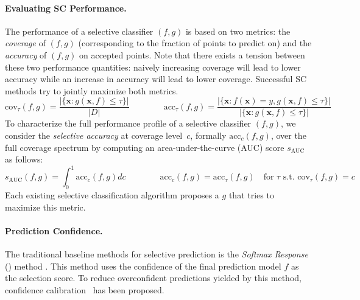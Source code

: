 \paragraph{Evaluating SC Performance.} The performance of a selective classifier $(f,g)$ is based on two metrics: the \emph{coverage} of $(f,g)$ (corresponding to the fraction of points to predict on) and the \emph{accuracy} of $(f,g)$ on accepted points. Note that there exists a tension between these two performance quantities: naively increasing coverage will lead to lower accuracy while an increase in accuracy will lead to lower coverage. Successful SC methods try to jointly maximize both metrics.
    \begin{equation}
    \text{cov}_\tau(f,g) = \frac{|\{\bm{x} : g(\bm{x}, f) \leq \tau \}|}{|D|} \qquad \qquad 
    \text{acc}_\tau(f,g) = \frac{|\{\bm{x} : f(\bm{x}) = y, g(\bm{x}, f) \leq \tau \}|}{|\{\bm{x} : g(\bm{x}, f) \leq \tau \}|}
    \end{equation}
To characterize the full performance profile of a selective classifier $(f,g)$, we consider the \emph{selective accuracy} at coverage level~$c$, formally $\text{acc}_c(f,g)$, over the full coverage spectrum by computing an area-under-the-curve (AUC) score $s_\text{AUC}$ as follows:
\begin{equation}
\label{eq:sc_perf}
    s_\text{AUC}(f,g) = \int_0^1 \text{acc}_c(f,g)dc \qquad \qquad  \text{acc}_c(f,g) = \text{acc}_\tau(f,g)\quad \text{for $\tau$ s.t. $\text{cov}_\tau(f,g) = c$} 
\end{equation}
Each existing selective classification algorithm proposes a $g$ that tries to maximize this metric.

\paragraph{Prediction Confidence.} The traditional baseline methods for selective prediction is the \emph{Softmax Response} (\sr) method \citep{hendrycks2016baseline, geifman2017selective}. This method uses the confidence of the final prediction model $f$ as the selection score. To reduce overconfident predictions yielded by this method, confidence calibration~\citep{guo2017calibration} has been proposed.

